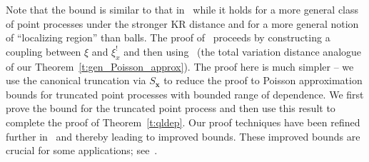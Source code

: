 \documentclass[AHL,Unicode,longabstracts]{cedram}
\newcommand{\bx}{\mathbf{x}}
\begin{document}
Note that the bound is similar to that in~\cite[Theorem~3.3]{Otto2020} while it holds for a more general class of point processes under the stronger KR distance {and for a {more} general notion of ``localizing region'' than balls}. The proof of~\cite[Theorem~3.3]{Otto2020} proceeds by constructing a coupling between $\xi$ and $\xi^{!}_{x}$ and then using~\cite[Theorem~2.6]{Barbour1992} (the total variation distance analogue of our Theorem~\ref{t:gen_Poisson_approx}). The proof here is much simpler -- we use the canonical truncation via $S_{\bx}$ to reduce the proof to Poisson approximation bounds for truncated point processes with bounded range of dependence. We first prove the bound for the truncated point process and then use this result to complete the proof of Theorem~\ref{t:qldep}. Our proof techniques have been refined further in~\cite[Theorem~8]{Otto2021} and thereby leading to improved bounds. These improved bounds are crucial for some applications; see~\cite{Otto2021}.
\end{document}
